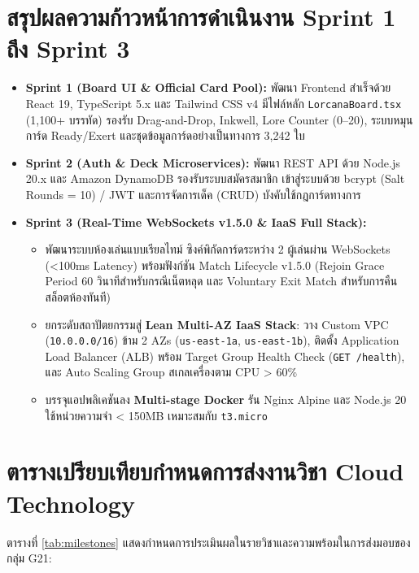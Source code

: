\documentclass[12pt,a4paper]{report}
\begin{document}
\section{สรุปผลความก้าวหน้าการดำเนินงาน Sprint 1 ถึง Sprint 3}
\begin{itemize}
    \item \textbf{Sprint 1 (Board UI \& Official Card Pool):} พัฒนา Frontend สำเร็จด้วย React 19, TypeScript 5.x และ Tailwind CSS v4 มีไฟล์หลัก \texttt{LorcanaBoard.tsx} (1,100+ บรรทัด) รองรับ Drag-and-Drop, Inkwell, Lore Counter (0--20), ระบบหมุนการ์ด Ready/Exert และชุดข้อมูลการ์ดอย่างเป็นทางการ 3,242 ใบ
    \item \textbf{Sprint 2 (Auth \& Deck Microservices):} พัฒนา REST API ด้วย Node.js 20.x และ Amazon DynamoDB รองรับระบบสมัครสมาชิก เข้าสู่ระบบด้วย bcrypt (Salt Rounds = 10) / JWT และการจัดการเด็ค (CRUD) บังคับใช้กฎการ์ดทางการ
    \item \textbf{Sprint 3 (Real-Time WebSockets v1.5.0 \& IaaS Full Stack):}
    \begin{itemize}
        \item พัฒนาระบบห้องเล่นแบบเรียลไทม์ ซิงค์พิกัดการ์ดระหว่าง 2 ผู้เล่นผ่าน WebSockets (<100ms Latency) พร้อมฟังก์ชัน Match Lifecycle v1.5.0 (Rejoin Grace Period 60 วินาทีสำหรับกรณีเน็ตหลุด และ Voluntary Exit Match สำหรับการคืนสล็อตห้องทันที)
        \item ยกระดับสถาปัตยกรรมสู่ \textbf{Lean Multi-AZ IaaS Stack}: วาง Custom VPC (\texttt{10.0.0.0/16}) ข้าม 2 AZs (\texttt{us-east-1a}, \texttt{us-east-1b}), ติดตั้ง Application Load Balancer (ALB) พร้อม Target Group Health Check (\texttt{GET /health}), และ Auto Scaling Group สเกลเครื่องตาม CPU > 60\%
        \item บรรจุแอปพลิเคชันลง \textbf{Multi-stage Docker} รัน Nginx Alpine และ Node.js 20 ใช้หน่วยความจำ < 150MB เหมาะสมกับ \texttt{t3.micro}
    \end{itemize}
\end{itemize}

\section{ตารางเปรียบเทียบกำหนดการส่งงานวิชา Cloud Technology}
ตารางที่ \ref{tab:milestones} แสดงกำหนดการประเมินผลในรายวิชาและความพร้อมในการส่งมอบของกลุ่ม G21:
\end{document}
